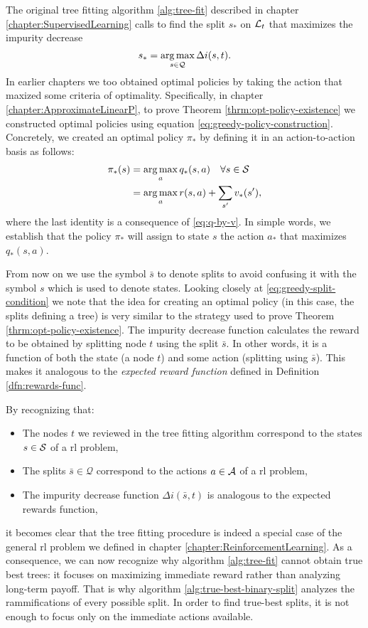 The original tree fitting algorithm \ref{alg:tree-fit} described in chapter
\ref{chapter:SupervisedLearning} calls to find the split $s_*$ on $\mathcal{L}_t$ that
maximizes the impurity decrease
\begin{equation}
    \label{eq:greedy-split-condition}
    s_* = \operatorname*{arg\,max}_{s \in \mathcal{Q}} \Delta i(s, t).
\end{equation}
In earlier chapters we too obtained optimal policies by taking the action that
maxized some criteria of optimality. Specifically, in chapter
\ref{chapter:ApproximateLinearP}, to prove Theorem
\ref{thrm:opt-policy-existence} we constructed optimal policies using equation
\eqref{eq:greedy-policy-construction}. Concretely, we created an optimal policy
$\pi_*$ by defining it in an action-to-action basis as follows:
\begin{align*}
    \pi_{*} (s) &= \operatorname*{arg\,max}_{a} q_{*} (s, a) \quad \forall s \in \mathcal{S} \\
    &= \operatorname*{arg\,max}_a r(s, a) + \sum_{s'} v_* (s'),
\end{align*}
where the last identity is a consequence of \eqref{eq:q-by-v}. In simple words,
we establish that the policy $\pi_*$ will assign to state $s$ the action $a_*$
that maximizes $q_* (s, a)$. 

From now on we use the symbol $\bar{s}$ to denote splits to avoid confusing it
with the symbol $s$ which is used to denote states. Looking closely at
\eqref{eq:greedy-split-condition} we note that the idea for creating an optimal
policy (in this case, the splits defining a tree) is very similar to the
strategy used to prove Theorem \ref{thrm:opt-policy-existence}. The impurity
decrease function calculates the reward to be obtained by splitting node $t$
using the split $\bar{s}$. In other words, it is a function of both the state (a
node $t$) and some action (splitting using $\bar{s}$). This makes it analogous
to the \emph{expected reward function} defined in Definition
\ref{dfn:rewards-func}.

By recognizing that:
\begin{itemize}
    \item The nodes $t$ we reviewed in the tree fitting algorithm correspond to
        the states $s \in \mathcal{S}$ of a \ac{rl} problem,
    \item The splits $\bar{s} \in \mathcal{Q}$ correspond to the actions $a \in
        \mathcal{A}$ of a \ac{rl} problem,
    \item The impurity decrease function $\Delta i(\bar{s}, t)$ is analogous to
        the expected rewards function,
\end{itemize}
it becomes clear that the tree fitting procedure is indeed a special case of the
general \ac{rl} problem we defined in chapter
\ref{chapter:ReinforcementLearning}. As a consequence, we can now recognize why
algorithm \ref{alg:tree-fit} cannot obtain true best trees: it focuses on
maximizing immediate reward rather than analyzing long-term payoff. That is why
algorithm \ref{alg:true-best-binary-split} analyzes the rammifications of every
possible split. In order to find true-best splits, it is not enough to focus
only on the immediate actions available.

